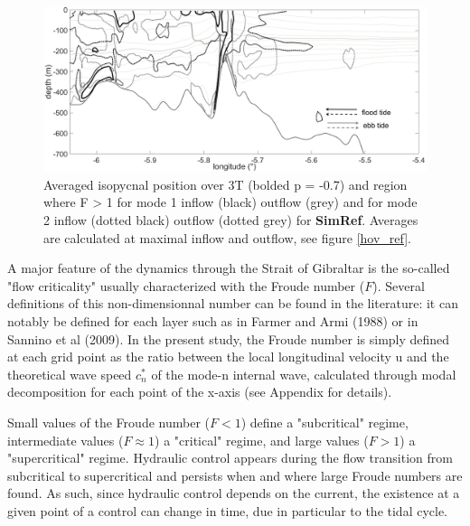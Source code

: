 \documentclass[a4paper,12pt]{article}
\begin{document}

\begin{figure}[!h]
 \centering
 \includegraphics[width=1\textwidth]{Fn_1-2_ref_3T.png}
 \caption{Averaged isopycnal position over 3T (bolded p = -0.7) and region where F > 1 for mode 1 inflow (black) outflow (grey) and for mode 2 inflow (dotted black) outflow (dotted grey) for \textbf{SimRef}. Averages are calculated at maximal inflow and outflow, see figure \ref{hov_ref}.}
 \label{fig_fn_ref}
\end{figure}

A major feature of the dynamics through the Strait of Gibraltar is the so-called "flow criticality" usually characterized with the Froude number ($F$). Several definitions of this non-dimensionnal number can be found in the literature: it can notably be defined for each layer such as in Farmer and Armi (1988) or in Sannino et al (2009). In the present study, the Froude number is simply defined at each grid point as the ratio between the local longitudinal velocity u and the theoretical wave speed $c^*_n$ of the mode-n internal wave, calculated through modal decomposition for each point of the x-axis (see Appendix for details).

Small values of the Froude number ($F < 1$) define a "subcritical" regime, intermediate values ($F \approx 1$) a "critical" regime, and large values ($F>1$) a "supercritical" regime. Hydraulic control appears during the flow transition from subcritical to supercritical and persists when and where large Froude numbers are found. As such, since hydraulic control depends on the current, the existence at a given point of a control can change in time, due in particular to the tidal cycle.
\end{document}
